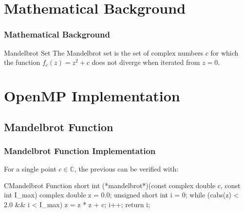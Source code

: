 \documentclass[xcolor=table]{beamer}
\title{\bft{OpenMP Implementation\\ of the Mandelbrot Set}}
\author{Marco Tallone}
\date{May 13, 2024}
\begin{document}
\frame{\titlepage} %


\section{Mathematical Background}

\begin{frame}
\frametitle{Mathematical Background}

\begin{block}{Mandelbrot Set}
	The Mandelbrot set is the set of complex numbers $c$ for which the function
	$f_c(z) = z^2 + c$ does not diverge when iterated from $z = 0$.
\end{block}

\vspace{0.5cm}


\vspace{0.5cm}


\end{frame}

\section{OpenMP Implementation}

\subsection{Mandelbrot Function}

\begin{frame}[fragile]
\frametitle{Mandelbrot Function Implementation}

For a single point $c \in \mathbb{C}$, the previous can be verified with:

\begin{code}{C}{Mandelbrot Function}{}{}
short int (*mandelbrot*)(const complex double c,
						         const int I_max) {
    complex double z = 0.0;
    unsigned short int i = 0;
		while (cabs(z) < 2.0 && i < I_max) {
        z = z * z + c;
        i++;
    }
    return i;
}
\end{code}

\end{frame}
\end{document}
